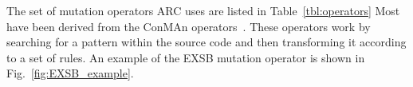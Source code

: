 \documentclass{llncs}
\begin{document}

The set of mutation operators ARC uses are listed in Table~\ref{tbl:operators}
Most have been derived from the ConMAn
operators~\cite{BCD06}. These operators work by searching for a pattern within
the source code and then transforming it according to a set of rules. An
example of the EXSB mutation operator is shown in Fig.~\ref{fig:EXSB_example}.
\end{document}
